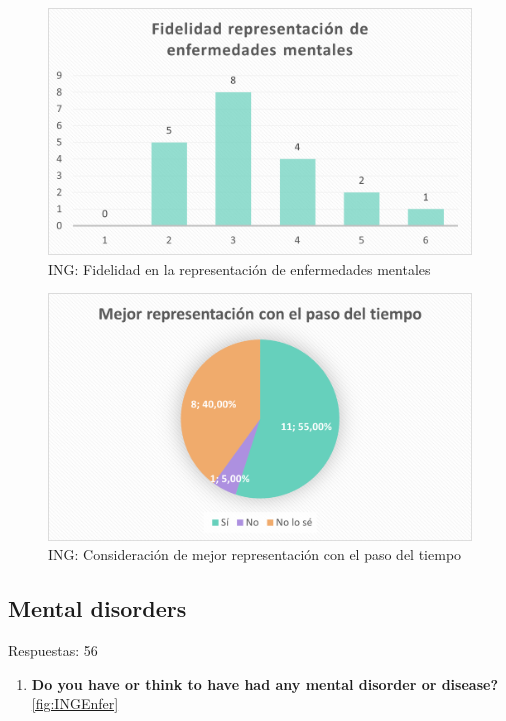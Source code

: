 \documentclass[12pt, a4paper,twoside,titlepage]{book}
\begin{document}
\begin{figure}
    \centering
    \includegraphics[width=.8\linewidth]{ANEXO ING/17AnexINGFid}
    \caption{ING: Fidelidad en la representación de enfermedades mentales}
    \label{fig:INGFidel}
\end{figure}

\begin{figure}
    \centering
    \includegraphics[width=.8\linewidth]{ANEXO ING/18AnexINGMejor}
    \caption{ING: Consideración de mejor representación con el paso del tiempo}
    \label{fig:INGMejor}
\end{figure}





\subsection{Mental disorders}
Respuestas: 56
\begin{enumerate}[label=\textbf{\arabic*}.]
     \item \textbf{Do you have or think to have had any mental disorder or disease? }\\
     \ref{fig:INGEnfer}
\end{enumerate}
\end{document}
